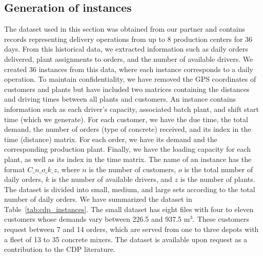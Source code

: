 \documentclass{article}
\begin{document}
\subsection{Generation of instances}
\newcommand{\nbInstance}{36}
The dataset used in this section was obtained from our partner and contains records representing delivery operations from up to 8 production centers for $\nbInstance$ days. From this historical data, we extracted information such as daily orders delivered, plant assignments to orders, and the number of available drivers. We created $\nbInstance$ instances from this data, where each instance corresponds to a daily operation. To maintain confidentiality, we have removed the GPS coordinates of customers and plants but have included two matrices containing the distances and driving times between all plants and customers. An instance contains information such as each driver's capacity, associated batch plant, and shift start time (which we generate). For each customer, we have the due time, the total demand, the number of orders (type of concrete) received, and its index in the time (distance) matrix. For each order, we have its demand and the corresponding production plant. Finally, we have the loading capacity for each plant, as well as its index in the time matrix. The name of an instance has the format $C\_n\_o\_k\_z$, where $n$ is the number of customers, $o$ is the total number of daily orders, $k$ is the number of available drivers, and $z$ is the number of plants. The dataset is divided into small, medium, and large sets according to the total number of daily orders. We have summarized the dataset in Table~\ref{tab:cdp_instances}. The small dataset has eight files with four to eleven customers whose demands vary between 226.5 and 937.5 m$^3$. These customers request between 7 and 14 orders, which are served from one to three depots with a fleet of 13 to 35 concrete mixers. The dataset is available upon request as a contribution to the CDP literature.
\begin{table}[htpb]
    \centering
    \caption{Instances summary}
    \label{tab:cdp_instances}
\end{table}
\end{document}
